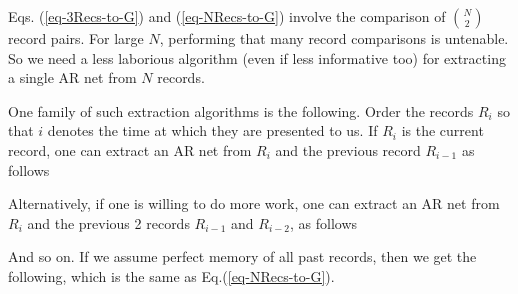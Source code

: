 \documentclass[12pt]{article}
\begin{document}
Eqs. (\ref{eq-3Recs-to-G})
and (\ref{eq-NRecs-to-G})
involve the comparison of $N\choose 2$
record pairs. For large $N$,
performing that many record comparisons
is untenable.
So we need a less laborious
algorithm (even if less informative too) for extracting
a single AR net from $N$  records.

One family of such extraction algorithms
is the following. Order the records $R_i$
so that $i$ denotes the time at
which  they 
are presented to us. If $R_i$ is the
current record,
one can extract an AR net from $R_i$ 
and the previous record $R_{i-1}$ as 
follows

\beq
{}
\eeq
Alternatively, if one
is willing to do more work,
one can extract an AR net from 
$R_i$ and the previous 2 records 
$R_{i-1}$ and $R_{i-2}$, as follows

\beq
{}
\eeq
And so on. If  we assume
perfect memory of all
past records, then we get the following,
which is the same as 
Eq.(\ref{eq-NRecs-to-G}).

\beq
{}
\eeq



\end{document}
